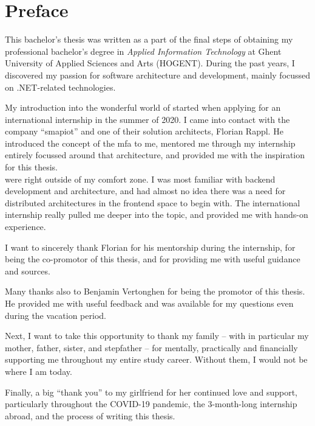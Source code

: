 
\chapter*{Preface}
\label{ch:preface}

This bachelor's thesis was written as a part of the final steps of obtaining my
professional bachelor's degree in \textit{Applied Information Technology} at
Ghent University of Applied Sciences and Arts (HOGENT). During the past years, I
discovered my passion for software architecture and development, mainly focussed
on .NET-related technologies.

My introduction into the wonderful world of  started
when applying for an international internship in the summer of 2020. I came into
contact with the company ``smapiot'' and one of their solution architects,
Florian Rappl. He introduced the concept of the \gls{mfa} to me, mentored me
through my internship entirely focussed around that architecture, and provided
me with the inspiration for this thesis.\\
 were right outside of my comfort zone. I was most
familiar with \gls{backend} development and architecture, and had almost no idea
there was a need for distributed architectures in the \gls{frontend} space to
begin with. The international internship really pulled me deeper into the topic,
and provided me with hands-on experience.

I want to sincerely thank Florian for his mentorship during the internship, for
being the co-promotor of this thesis, and for providing me with useful guidance
and sources. 

Many thanks also to Benjamin Vertonghen for being the promotor of
this thesis. He provided me with useful feedback and was available for my
questions even during the vacation period.

Next, I want to take this opportunity to thank my family -- with in particular
my mother, father, sister, and stepfather -- for mentally, practically and
financially supporting me throughout my entire study career. Without them, I
would not be where I am today.

Finally, a big ``thank you'' to my girlfriend for her continued love and
support, particularly throughout the COVID-19 pandemic, the 3-month-long
internship abroad, and the process of writing this thesis.